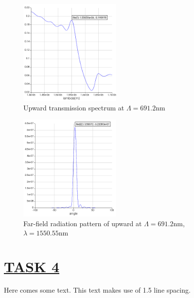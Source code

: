 \documentclass[fontsize=11pt]{scrartcl}
\begin{document}
\subsection{}

\begin{figure}[H]
    \centering
     \includegraphics[width=0.45\textwidth]{img/fig3.6.png}
     \caption{Upward transmission spectrum at $\Lambda=691.2\mathrm{nm}$}
     \label{fig3.6}
\end{figure}
\begin{figure}[H]
    \centering
     \includegraphics[width=0.45\textwidth]{img/fig3.7.png}
     \caption{Far-field radiation pattern of upward at $\Lambda=691.2\mathrm{nm}$,
     $\lambda=1550.55\mathrm{nm}$}
     \label{fig3.7}
\end{figure}
\pagebreak
\section{\uline{TASK 4}}
Here comes some text. This text makes use of 1.5 line spacing. 
\end{document}
